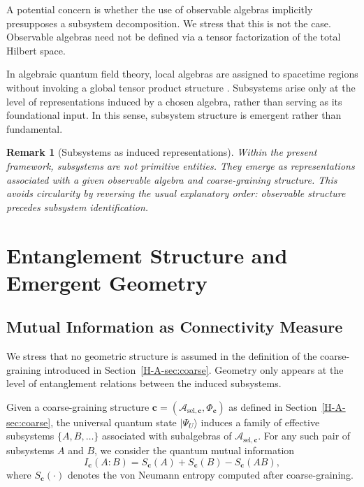 \documentclass[12pt,a4paper,openany]{book}
\newtheorem{remark}[theorem]{Remark}
\begin{document}
A potential concern is whether the use of observable algebras implicitly presupposes a subsystem decomposition. 
We stress that this is not the case. 
Observable algebras need not be defined via a tensor factorization of the total Hilbert space.

In algebraic quantum field theory, local algebras are assigned to spacetime regions without invoking a global tensor product structure \cite{Haag1996}. 
Subsystems arise only at the level of representations induced by a chosen algebra, rather than serving as its foundational input. 
In this sense, subsystem structure is emergent rather than fundamental.

\begin{remark}[Subsystems as induced representations]
Within the present framework, subsystems are not primitive entities. 
They emerge as representations associated with a given observable algebra and coarse-graining structure. 
This avoids circularity by reversing the usual explanatory order: observable structure precedes subsystem identification.
\end{remark}

\section{Entanglement Structure and Emergent Geometry}
\label{H-A-sec:geometry}

\subsection{Mutual Information as Connectivity Measure}

We stress that no geometric structure is assumed in the definition of the coarse-graining introduced in Section~\ref{H-A-sec:coarse}. 
Geometry only appears at the level of entanglement relations between the induced subsystems.

Given a coarse-graining structure $\mathbf{c} = (\mathcal{A}_{\mathrm{sel},\mathbf c},\Phi_{\mathbf c})$ as defined in Section~\ref{H-A-sec:coarse}, the universal quantum state $|\Psi_U\rangle$ induces a family of effective subsystems $\{A,B,\dots\}$ associated with subalgebras of $\mathcal{A}_{\mathrm{sel},\mathbf c}$.
For any such pair of subsystems $A$ and $B$, we consider the quantum mutual information
\begin{equation}
I_{\mathbf{c}}(A:B) = S_{\mathbf{c}}(A) + S_{\mathbf{c}}(B) - S_{\mathbf{c}}(AB),
\end{equation}
where $S_{\mathbf{c}}(\cdot)$ denotes the von Neumann entropy computed after coarse-graining.
\end{document}
